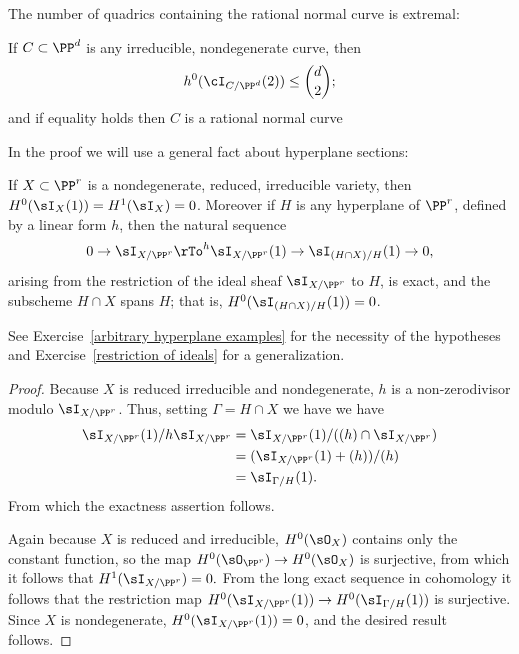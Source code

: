The number of quadrics containing the rational normal curve is extremal:

\begin{proposition}\label{rnc on most quadrics}
If $C \subset \PP^d$ is any irreducible, nondegenerate curve, then
$$
h^0(\cI_{C/\PP^d}(2)) \leq  \binom{d}{2};
$$
and if equality holds then $C$ is a rational normal curve
\end{proposition}

In the proof we will use a general fact about hyperplane sections:

\begin{proposition}\label{arbitrary hyperplane}
If $X\subset \PP^r$ is a nondegenerate, reduced, irreducible variety, 
then $H^0(\sI_X(1)) = H^1 (\sI_X) = 0$. Moreover if $H$ is any hyperplane of $\PP^r$, defined by
a linear form $h$, then the natural
sequence
$$
0\to \sI_{X/\PP^r} \rTo^h \sI_{X/\PP^r}(1)\to \sI_{(H\cap X)/H}(1)\to 0,
$$
arising from the restriction of the ideal sheaf $\sI_{X/\PP^r}$ to $H$, is exact, and the subscheme
$H\cap X$ spans $H$; that is, $H^0(\sI_{(H\cap X)/H}(1)) = 0$.
\end{proposition}

See Exercise~\ref{arbitrary hyperplane examples} for the necessity of the hypotheses
and Exercise~\ref{restriction of ideals} for a generalization. 

\begin{proof}
Because $X$ is reduced irreducible and nondegenerate,
$h$ is a non-zerodivisor modulo $\sI_{X/\PP^r}$. Thus, setting $\Gamma = {H\cap X}$ we have
we have 
$$
\begin{aligned}
\sI_{X/\PP^r}(1)/h\sI_{X/\PP^r} &= \sI_{X/\PP^r}(1)/((h)\cap\sI_{X/\PP^r})\\
 &=(\sI_{X/\PP^r}(1)+(h))/(h)\\
 &= \sI_{\Gamma/H}(1).
\end{aligned}
 $$
 From which the exactness assertion follows.
 
 Again because $X$ is reduced and irreducible, $H^0(\sO_X)$ contains only the constant function, so the map $H^0(\sO_{\PP^r}) \to H^0(\sO_X)$ is surjective, 
from which it follows that $H^1(\sI_{X/\PP^r}) = 0.$ From the long exact sequence in cohomology it follows that
 the restriction map $H^0(\sI_{X/\PP^r}(1))\to H^0(\sI_{\Gamma/H}(1))$ is surjective. Since
$X$ is nondegenerate, $H^0(\sI_{X/\PP^r}(1)) = 0$, and the desired result follows.
\end{proof}


